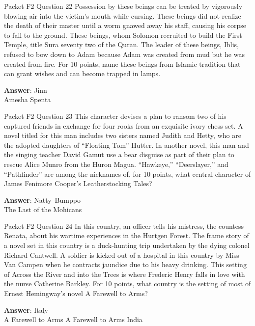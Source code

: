 \begin{frame}{Packet F2 Question 22}
Possession by these beings can be treated by vigorously blowing air into the victim’s mouth while cursing. These beings did not realize the death of their master until a worm gnawed away his staff, causing his corpse to fall to the ground. These   beings, whom Solomon recruited to build   the First Temple, title Sura seventy two of the Quran. The leader of these beings, Iblis, refused   to bow down to Adam because Adam was created from mud but he was created from fire. For 10 points, name these beings from Islamic tradition that can grant wishes and can become trapped in lamps.  

\textbf{Answer}: Jinn\\
 Amesha Spenta
\end{frame}

\begin{frame}{Packet F2 Question 23}
This character devises a plan to ransom two of his captured friends in exchange for   four rooks from an exquisite ivory chess set. A novel titled   for this man includes   two sisters named Judith and Hetty, who are the adopted daughters of “Floating Tom” Hutter. In another novel, this man and the singing teacher David Gamut use a bear disguise as part of their plan to rescue Alice Munro from the Huron Magua.   “Hawkeye,” “Deerslayer,” and “Pathfinder” are among the nicknames of, for 10 points, what central character of James   Fenimore Cooper’s Leatherstocking Tales?

\textbf{Answer}: Natty\ Bumppo\\
 The Last of the Mohicans
\end{frame}

\begin{frame}{Packet F2 Question 24}
In this country, an officer   tells his mistress, the countess Renata, about his wartime experiences in the Hurtgen Forest. The frame story of a   novel set in this country is a duck-hunting trip undertaken by the dying colonel Richard Cantwell. A soldier is kicked out of a hospital in this country by Miss Van Campen when he contracts jaundice due to his heavy drinking. This setting of Across the River and into the Trees is where Frederic Henry falls in love with the nurse Catherine   Barkley. For 10 points,   what country is the setting of most of Ernest Hemingway’s novel A Farewell to Arms?  

\textbf{Answer}: Italy\\
 A Farewell to Arms
 A Farewell to Arms
 India
\end{frame}


